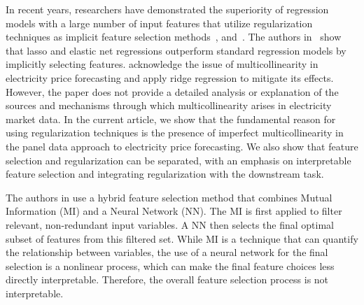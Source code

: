 \documentclass{article}
\begin{document}
In recent years, researchers have demonstrated the superiority of regression models with a large number of input features that utilize regularization techniques as implicit feature selection methods~\cite{ziel2018day}, and~\cite{ ziel2016forecasting}. The authors in~\cite{uniejewski2016automated} show that lasso and elastic net regressions outperform standard regression models by implicitly selecting features. \cite{MIRAKYAN2017228} acknowledge the issue of multicollinearity in electricity price forecasting and apply ridge regression to mitigate its effects. However, the paper does not provide a detailed analysis or explanation of the sources and mechanisms through which multicollinearity arises in electricity market data. In the current article, we show that the fundamental reason for using regularization techniques is the presence of imperfect multicollinearity in the panel data approach to electricity price forecasting. We also show that feature selection
and regularization can be separated, with an emphasis on interpretable feature selection and integrating regularization with the downstream task. 



The authors in \cite{pourdaryaei2024new} use a hybrid feature selection method that combines Mutual Information (MI) and a Neural Network (NN). The MI is first applied to filter relevant, non-redundant input variables. A NN then selects the final optimal subset of features from this filtered set. While MI is a technique that can quantify the relationship between variables, the use of a neural network for the final selection is a nonlinear process, which can make the final feature choices less directly interpretable. Therefore, the overall feature selection process is not interpretable. 
\end{document}
